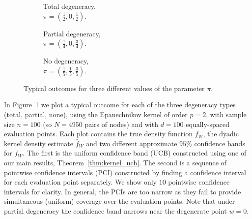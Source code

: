 \documentclass[11pt,lof]{puthesis}
\theoremstyle{break}
\theoremstyle{proof}
\begin{document}
\begin{figure}[b!]
\centering
%
\begin{subfigure}{0.32\textwidth}
\centering
\caption{Total degeneracy, \\
$\pi = \left( \frac{1}{2}, 0, \frac{1}{2} \right)$.}
\end{subfigure}
%
\begin{subfigure}{0.32\textwidth}
\centering
\caption{Partial degeneracy, \\
$\pi = \left( \frac{1}{4}, 0, \frac{3}{4} \right)$.}
\end{subfigure}
%
\begin{subfigure}{0.32\textwidth}
\centering
\caption{No degeneracy, \\
$\pi = \left( \frac{1}{5}, \frac{1}{5}, \frac{3}{5} \right)$.}
\end{subfigure}
%
\caption[Typical outcomes for different values of the parameter $\pi$]
{Typical outcomes for three different values of the parameter $\pi$.}
%
\label{fig:kernel_results}
%
\end{figure}

In Figure~\ref{fig:kernel_results} we plot a typical outcome for each of the
three
degeneracy types (total, partial, none), using the Epanechnikov kernel of order
$p=2$, with sample size $n=100$ (so $N=4950$ pairs of nodes) and with $d=100$
equally-spaced evaluation points. Each plot contains the true density function
$f_W$, the dyadic kernel density estimate $\hat f_W$ and two different
approximate $95\%$ confidence bands for $f_W$. The first is the uniform
confidence band (UCB) constructed using one of our main results,
Theorem~\ref{thm:kernel_ucb}. The second is a sequence of pointwise confidence
intervals (PCI) constructed by finding a confidence interval for each
evaluation point separately. We show only $10$ pointwise confidence intervals
for clarity. In general, the PCIs are too narrow as they fail to provide
simultaneous (uniform) coverage over the evaluation points. Note that under
partial degeneracy the confidence band narrows near the degenerate point
$w = 0$.
\end{document}
